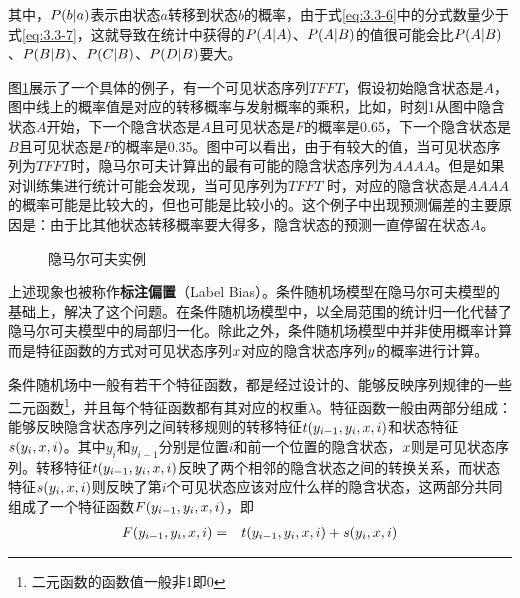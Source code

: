 \noindent 其中，${P}(b|a)$表示由状态$a$转移到状态$b$的概率，由于式\eqref{eq:3.3-6}中的分式数量少于式\eqref{eq:3.3-7}，这就导致在统计中获得的${P}(A|A)$、${P}(A|B)$的值很可能会比${P}(A|B)$、${P}(B|B)$、${P}(C|B)$、${P}(D|B)$要大。

\parinterval 图\ref{fig:3.3-5}展示了一个具体的例子，有一个可见状态序列$T F F T$，假设初始隐含状态是$A$，图中线上的概率值是对应的转移概率与发射概率的乘积，比如，时刻1从图中隐含状态$A$开始，下一个隐含状态是$A$且可见状态是$F$的概率是0.65，下一个隐含状态是$B$且可见状态是$F$的概率是0.35。图中可以看出，由于有较大的值，当可见状态序列为$T F F T$时，隐马尔可夫计算出的最有可能的隐含状态序列为$A A A A$。但是如果对训练集进行统计可能会发现，当可见序列为$T F F T$ 时，对应的隐含状态是$A A A A$的概率可能是比较大的，但也可能是比较小的。这个例子中出现预测偏差的主要原因是：由于比其他状态转移概率要大得多，隐含状态的预测一直停留在状态$A$。

\begin{figure}[htp]
\centering

\caption{隐马尔可夫实例}
\label{fig:3.3-5}
\end{figure}

\parinterval 上述现象也被称作{\small\sffamily\bfseries{标注偏置}}（Label Bias）。条件随机场模型在隐马尔可夫模型的基础上，解决了这个问题。在条件随机场模型中，以全局范围的统计归一化代替了隐马尔可夫模型中的局部归一化。除此之外，条件随机场模型中并非使用概率计算而是特征函数的方式对可见状态序列${x}$对应的隐含状态序列${y}$的概率进行计算。

\parinterval 条件随机场中一般有若干个特征函数，都是经过设计的、能够反映序列规律的一些二元函数\footnote{二元函数的函数值一般非1即0}，并且每个特征函数都有其对应的权重$\lambda$。特征函数一般由两部分组成：能够反映隐含状态序列之间转移规则的转移特征$t(y_{i-1},y_i,{x},i)$和状态特征$s(y_i,{x},i)$。其中$y_i$和$y_{i-1}$分别是位置$i$和前一个位置的隐含状态，${x}$则是可见状态序列。转移特征$t(y_{i-1},y_i,{x},i)$反映了两个相邻的隐含状态之间的转换关系，而状态特征$s(y_i,{x},i)$则反映了第$i$个可见状态应该对应什么样的隐含状态，这两部分共同组成了一个特征函数$F(y_{i-1},y_i,{x},i)$，即
\begin{eqnarray}
F(y_{i-1},y_i,{x},i) & = & t(y_{i-1},y_i,{x},i)+s(y_i,{x},i)
\label{eq:3.3-8}
\end{eqnarray}
	
